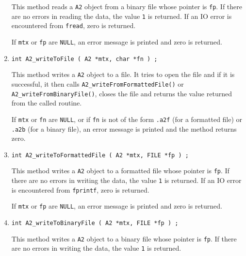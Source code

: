 \begin{enumerate}
This method reads a {\tt A2} object from a binary file
whose pointer is {\tt fp}.
If there are no errors in reading the data, 
the value {\tt 1} is returned.
If an IO error is encountered from {\tt fread}, zero is returned.
\par {}
If {\tt mtx} or {\tt fp} are {\tt NULL},
an error message is printed and zero is returned.
\item
\begin{verbatim}
int A2_writeToFile ( A2 *mtx, char *fn ) ;
\end{verbatim}
\par
This method writes a {\tt A2} object to a file.
It tries to open the file and if it is successful, 
it then calls {\tt A2\_writeFromFormattedFile()} or
{\tt A2\_writeFromBinaryFile()},
closes the file
and returns the value returned from the called routine.
\par {}
If {\tt mtx} or {\tt fn} are {\tt NULL}, 
or if {\tt fn} is not of the form
{\tt *.a2f} (for a formatted file) 
or {\tt *.a2b} (for a binary file),
an error message is printed and the method returns zero.
\item
\begin{verbatim}
int A2_writeToFormattedFile ( A2 *mtx, FILE *fp ) ;
\end{verbatim}
\par
This method writes a {\tt A2} object to a formatted file
whose pointer is {\tt fp}.
If there are no errors in writing the data, 
the value {\tt 1} is returned.
If an IO error is encountered from {\tt fprintf}, zero is returned.
\par {}
If {\tt mtx} or {\tt fp} are {\tt NULL},
an error message is printed and zero is returned.
\item
\begin{verbatim}
int A2_writeToBinaryFile ( A2 *mtx, FILE *fp ) ;
\end{verbatim}
\par
This method writes a {\tt A2} object to a binary file
whose pointer is {\tt fp}.
If there are no errors in writing the data, 
the value {\tt 1} is returned.

\end{enumerate}

